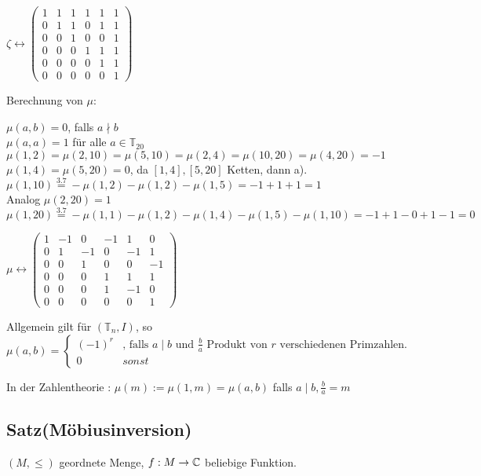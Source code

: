 \begin{enumerate}
	$\zeta \leftrightarrow
	\begin{pmatrix}
	1 & 1 & 1 & 1 & 1 & 1 \\
	0 & 1 & 1 & 0 & 1 & 1 \\
	0 & 0 & 1 & 0 & 0 & 1 \\
	0 & 0 & 0 & 1 & 1 & 1 \\
	0 & 0 & 0 & 0 & 1 & 1 \\
	0 & 0 & 0 & 0 & 0 & 1
	\end{pmatrix}$
	
	Berechnung von $\mu$:
	
	$\mu(a, b) = 0$, falls $a\nmid b$ 
	\\$\mu(a, a) = 1$ für alle $a \in \mathbb{T}_{20}$
	\\$\mu(1, 2) = \mu(2, 10) = \mu(5, 10) = \mu(2, 4) = \mu(10, 20) = \mu(4, 20) = -1$
	\\$\mu(1, 4) = \mu(5, 20) = 0$, da $[1, 4], [5, 20]$ Ketten, dann a).
	\\ $\mu(1, 10) \stackrel{3.7}{=} %
	-\mu(1, 2) - \mu(1, 2) - \mu(1, 5) = - 1 + 1 + 1 = 1$
	\\ Analog $\mu(2, 20) = 1$
	\\ $\mu(1, 20) \stackrel{3.7}{=} %
	-\mu(1, 1) - \mu(1, 2) - \mu(1, 4) - \mu(1,5) - \mu(1, 10) = -1 + 1 -0 +1 -1 = 0$
	
	
	$\mu \leftrightarrow
		\begin{pmatrix}
		1 & -1 & 0 & -1 & 1 & 0 \\
		0 & 1 & -1 & 0 & -1 & 1 \\
		0 & 0 & 1 & 0 & 0 & -1 \\
		0 & 0 & 0 & 1 & 1 & 1 \\
		0 & 0 & 0 & 1 & -1 & 0 \\
		0 & 0 & 0 & 0 & 0 & 1
		\end{pmatrix}$
	
	
	Allgemein gilt für $(\mathbb{T}_n, I)$, so 
	$\mu(a, b) = \begin{cases}
	(-1)^r & \text{, falls } a \mid b \text{ und } \frac{b}{a} \text{ Produkt von } r \text{ verschiedenen Primzahlen.} \\
	0 & sonst 
	\end{cases}$
	
	In der Zahlentheorie : 
	$\mu(m) := \mu(1, m) = \mu(a, b)$ falls $a\mid b, \frac{b}{a} = m$
			
			
\end{enumerate}
	
	\subsection{Satz(Möbiusinversion)}
	$(M,\leq)$ geordnete Menge, $f: M\rightarrow \operatorname{\mathbb{C}}$ beliebige Funktion.
	
